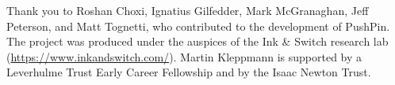 \documentclass[sigplan,10pt]{acmart}
\begin{document}
\begin{acks}
Thank you to Roshan Choxi, Ignatius Gilfedder, Mark McGranaghan, Jeff Peterson, and Matt Tognetti, who contributed to the development of PushPin.
The project was produced under the auspices of the Ink \& Switch research lab (\url{https://www.inkandswitch.com/}).
Martin Kleppmann is supported by a Leverhulme Trust Early Career Fellowship and by the Isaac Newton Trust.
\end{acks}


{}
\end{document}
